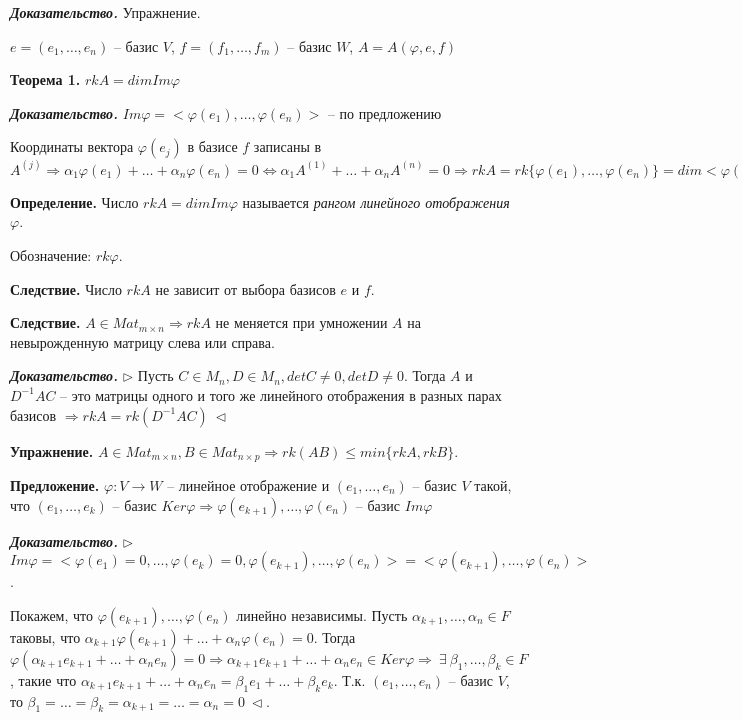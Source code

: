\bigskip
\textbf{\textit{Доказательство.}} Упражнение.

\bigskip
$e = (e_1, \dots, e_n)$ -- базис $V$, $f = (f_1, \dots, f_m)$ -- базис $W$, $A = A(\varphi, e, f)$

\bigskip
\textbf{Теорема 1.} $rkA = dim Im \varphi$

\bigskip
\textbf{\textit{Доказательство.}} $Im \varphi = <\varphi(e_1), \dots, \varphi(e_n)>$ -- по предложению

Координаты вектора $\varphi(e_j)$ в базисе $f$ записаны в $A^{(j)} \Rightarrow \alpha_1 \varphi(e_1) + \dots + \alpha_n \varphi(e_n) = 0 \Leftrightarrow \alpha_1 A^{(1)} + \dots + \alpha_n A^{(n)} = 0 \Rightarrow rkA = rk \{\varphi(e_1), \dots, \varphi(e_n) \} = dim <\varphi(e_1), \dots, \varphi(e_n)> = dim Im \varphi \ \lhd$

\bigskip
\textbf{Определение.} Число $rkA = dim Im \varphi$ называется \textit{рангом линейного отображения} $\varphi$.

Обозначение: $rk \varphi$.

\bigskip
\textbf{Следствие.} Число $rkA$ не зависит от выбора базисов $e$ и $f$.

\bigskip
\textbf{Следствие.} $A \in Mat_{m \times n} \Rightarrow rkA$ не меняется при умножении $A$ на невырожденную матрицу слева или справа.

\bigskip
\textbf{\textit{Доказательство.}} $\rhd$ Пусть $C \in M_n, D \in M_n, detC \neq 0, detD \neq 0$. Тогда $A$ и $D^{-1} A C$ -- это матрицы одного и того же линейного отображения в разных парах базисов $\Rightarrow rkA = rk (D^{-1} A C) \ \lhd$

\bigskip
\textbf{Упражнение.} $A \in Mat_{m \times n}, B \in Mat_{n \times p} \Rightarrow rk(AB) \leq min\{rk A, rkB\}$.

\bigskip
\textbf{Предложение.} $\varphi: V \rightarrow W$ -- линейное отображение и $(e_1, \dots, e_n)$ -- базис $V$ такой, что $(e_1, \dots, e_k)$ -- базис $Ker \varphi \Rightarrow \varphi(e_{k+1}), \dots, \varphi(e_n)$ -- базис $Im \varphi$

\bigskip
\textbf{\textit{Доказательство.}} $\rhd$ $Im \varphi = <\varphi(e_1) = 0, \dots, \varphi(e_k) = 0, \varphi(e_{k+1}), \dots, \varphi(e_n)> = <\varphi(e_{k+1}), \dots, \varphi(e_n)>$.

Покажем, что $\varphi(e_{k+1}), \dots, \varphi(e_n)$ линейно независимы. Пусть $\alpha_{k+1}, \dots, \alpha_n \in F$ таковы, что $\alpha_{k+1} \varphi(e_{k+1}) + \dots + \alpha_n \varphi(e_n) = 0$. Тогда $\varphi(\alpha_{k+1} e_{k+1} + \dots + \alpha_n e_n) = 0 \Rightarrow \alpha_{k+1} e_{k+1} + \dots + \alpha_n e_n \in Ker \varphi \Rightarrow \ \exists \ \beta_1, \dots, \beta_k \in F$, такие что $\alpha_{k+1} e_{k+1} + \dots + \alpha_n e_n = \beta_1 e_1 + \dots + \beta_k e_k$. Т.к. $(e_1, \dots, e_n)$ -- базис $V$, то $\beta_1 = \dots = \beta_k = \alpha_{k+1} = \dots = \alpha_n = 0 \ \lhd$.

